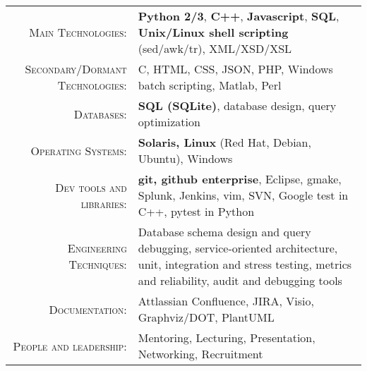 %
%
%

\renewcommand{\arraystretch}{1.1}

	\begin{tabular}{>{}r>{}p{13cm}} 
		\textsc{Main Technologies:}  		&   \textbf{Python 2/3}, \textbf{C++}, \textbf{Javascript}, \textbf{SQL}, \textbf{Unix/Linux shell scripting} (sed/awk/tr), XML/XSD/XSL\\ 
       	\textsc{Secondary/Dormant Technologies:}  		&   C, HTML, CSS, JSON, PHP, Windows batch scripting, Matlab, Perl\\ 
		\textsc{Databases:}               	&   \textbf{SQL (SQLite)}, database design, query optimization\\ 
		\textsc{Operating Systems:}                  &   \textbf{Solaris, Linux} (Red Hat, Debian, Ubuntu), Windows \\ 
		\textsc{Dev tools and libraries:}	  		&   \textbf {git, github enterprise}, Eclipse, gmake, Splunk, Jenkins, vim, SVN, Google test in C++, pytest in Python\\
		\textsc{Engineering Techniques:}					        &   Database schema design and query debugging, service-oriented architecture, unit, integration and stress testing, metrics and reliability, audit and debugging tools \\
		\textsc{Documentation:}					        &   Attlassian Confluence, JIRA, Visio, Graphviz/DOT, PlantUML  \\        
        \textsc{People and leadership:}				        &   Mentoring, Lecturing, Presentation, Networking, Recruitment \\
	\end{tabular}